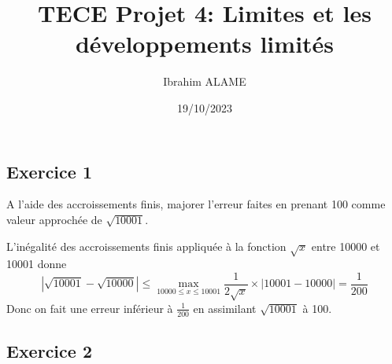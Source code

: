 \documentclass{article}[11pt]
\title{TECE Projet 4: Limites et les développements limités}
\author{Ibrahim ALAME}
\date{19/10/2023}
\begin{document}
\maketitle
\subsection*{Exercice 1}
{\color{blue}
A l'aide des accroissements finis, majorer l'erreur faites en prenant 100 comme valeur approchée de $\sqrt{10001}$.}

L'inégalité des accroissements finis appliquée à la fonction $\sqrt x$ entre 10000 et 10001 donne
\[|\sqrt{10001}-\sqrt{10000}|\leq \max_{10000\leq x\leq 10001}\frac{1}{2\sqrt x} \times|10001-10000|=\frac{1}{200}\]
Donc on fait une erreur inférieur à $\frac{1}{200}$ en assimilant $\sqrt{10001}$ à 100.
\subsection*{Exercice 2}
\end{document}

